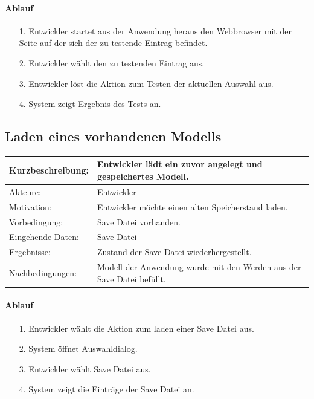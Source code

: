 \paragraph{Ablauf}

\begin{itemize}[itemsep=0pt]
\item[1.] Entwickler startet aus der Anwendung heraus den Webbrowser mit der Seite auf der sich der zu testende Eintrag befindet. 
\item[2.] Entwickler wählt den zu testenden Eintrag aus.
\item[3.] Entwickler löst die Aktion zum Testen der aktuellen Auswahl aus. 
\item[4.] System zeigt Ergebnis des Tests an.
\end{itemize}


\subsection{Laden eines vorhandenen Modells}
\label{sec:load}

\begin{tabular}[h]{|p{4cm}|p{}|}
\hline 
\rule[-1ex]{0pt}{2.5ex}Kurzbeschreibung: & 
Entwickler lädt ein zuvor angelegt und gespeichertes Modell. \\  
\hline 
\rule[-1ex]{0pt}{2.5ex}Akteure: & 
Entwickler \\ 
\hline 
\rule[-1ex]{0pt}{2.5ex}Motivation: & 
Entwickler möchte einen alten Speicherstand laden. \\ 
\hline 
\rule[-1ex]{0pt}{2.5ex}Vorbedingung: & 
Save Datei vorhanden. \\ 
\hline 
\rule[-1ex]{0pt}{2.5ex}Eingehende Daten: & Save Datei\\ 
\hline 
\rule[-1ex]{0pt}{2.5ex}Ergebnisse: & Zustand der Save Datei wiederhergestellt. \\ 
\hline 
\rule[-1ex]{0pt}{2.5ex}Nachbedingungen: & Modell der Anwendung wurde mit den Werden aus der Save Datei befüllt.  \\ 
\hline 
\end{tabular} 

\paragraph{Ablauf}

\begin{itemize}[itemsep=0pt]
\item[1.] Entwickler wählt die Aktion zum laden einer Save Datei aus.
\item[2.] System öffnet Auswahldialog. 
\item[3.] Entwickler wählt Save Datei aus.
\item[4.] System zeigt die Einträge der Save Datei an.
\end{itemize}

